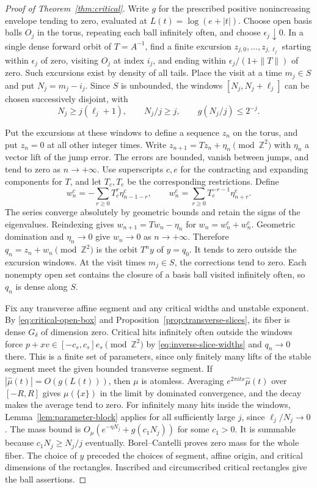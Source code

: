 \documentclass[11pt,a4paper,reqno]{amsart}
\theoremstyle{definition}
\theoremstyle{remark}
\numberwithin{equation}{section}
\begin{document}
\begin{proof}[Proof of Theorem~\ref{thm:critical}]
Write \(g\) for the prescribed positive nonincreasing envelope
tending to zero, evaluated at \(L(t)=\log(e+|t|)\). Choose open
basis balls \(O_j\) in the torus, repeating each ball infinitely
often, and choose \(\epsilon_j\downarrow0\). In a single dense
forward orbit of \(T=A^{-1}\), find a finite excursion
\(z_{j,0},\ldots,z_{j,\ell_j}\) starting within \(\epsilon_j\) of
zero, visiting \(O_j\) at index \(i_j\), and ending within
\(\epsilon_j/(1+\|T\|)\) of zero. Such excursions exist by density
of all tails. Place the visit at a time \(m_j\in S\) and put
\(N_j=m_j-i_j\). Since \(S\) is unbounded, the windows
\([N_j,N_j+\ell_j]\) can be chosen successively disjoint, with
\[
 N_j\ge j(\ell_j+1),\qquad N_j/j\ge j,\qquad
 g(N_j/j)\le2^{-j}.
\]

Put the excursions at these windows to define a sequence \(z_n\)
on the torus, and put \(z_n=0\) at all other integer times. Write
\(z_{n+1}=Tz_n+\eta_n\pmod{\mathbb Z^2}\) with \(\eta_n\) a
vector lift of the jump error. The errors are bounded, vanish
between jumps, and tend to zero as \(n\to+\infty\).
Use superscripts \(c,e\) for the contracting and expanding
components for \(T\), and let \(T_c,T_e\) be the corresponding
restrictions. Define
\[
 w_n^c=-\sum_{r\ge0}T_c^r\eta_{n-1-r}^c,\qquad
 w_n^e=\sum_{r\ge0}T_e^{-r-1}\eta_{n+r}^e.
\]
The series converge absolutely by geometric bounds and retain the
signs of the eigenvalues. Reindexing gives
\(w_{n+1}=Tw_n-\eta_n\) for \(w_n=w_n^c+w_n^e\).
Geometric domination and \(\eta_n\to0\) give \(w_n\to0\) as
\(n\to+\infty\). Therefore \(q_n=z_n+w_n\pmod{\mathbb Z^2}\)
is the orbit \(T^n y\) of \(y=q_0\). It tends to zero outside
the excursion windows. At the visit times \(m_j\in S\), the
corrections tend to zero. Each nonempty open set contains the
closure of a basis ball visited infinitely often, so \(q_n\) is
dense along \(S\).

Fix any transverse affine segment and any critical widths and
unstable exponent. By \eqref{eq:critical-open-box} and
Proposition~\ref{prop:transverse-slices}, its fiber is dense
\(G_\delta\) of dimension zero. Critical hits infinitely often
outside the windows force
\(p+xv\in[-c_s,c_s]e_s\pmod{\mathbb Z^2}\) by
\eqref{eq:inverse-slice-widths} and \(q_n\to0\) there. This is a
finite set of parameters, since only finitely many lifts of the
stable segment meet the given bounded transverse segment.
If \(|\widehat\mu(t)|=O(g(L(t)))\), then \(\mu\) is atomless.
Averaging \(e^{2\pi i tx}\widehat\mu(t)\) over \([-R,R]\) gives
\(\mu(\{x\})\) in the limit by dominated convergence, and the
decay makes the average tend to zero. For infinitely many hits
inside the windows, Lemma~\ref{lem:parameter-block} applies for
all sufficiently large \(j\), since \(\ell_j/N_j\to0\).
The mass bound is \(O_\mu(e^{-\eta N_j}+g(c_1N_j))\) for some
\(c_1>0\). It is summable because \(c_1N_j\ge N_j/j\) eventually.
Borel--Cantelli proves zero mass for the whole fiber. The choice
of \(y\) preceded the choices of segment, affine origin, and
critical dimensions of the rectangles. Inscribed and circumscribed
critical rectangles give the ball assertions.


\end{proof}
\end{document}
